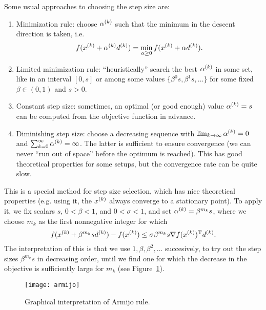 \documentclass{article}
\begin{document}
Some usual approaches to choosing the step size are:
\begin{enumerate}
\item Minimization rule: choose \(\alpha^{(k)}\) such that the minimum in the descent direction is
  taken, i.e.
  \begin{equation*}
    f(x^{(k)} + \alpha^{(k)}d^{(k)}) = \min_{\alpha \geq 0} f(x^{(k)} + \alpha d^{(k)}).
  \end{equation*}
\item Limited minimization rule: ``heuristically'' search the best \(\alpha^{(k)}\) in some set,
  like in an interval \([0, s]\) or among some values \(\{\beta^0 s, \beta^1 s, \ldots \}\) for some
  fixed \(\beta \in (0, 1)\) and \(s > 0\).
\item Constant step size: sometimes, an optimal (or good enough) value \(\alpha^{(k)} = s\) can be
  computed from the objective function in advance.
\item Diminishing step size: choose a decreasing sequence with
  \(\lim_{k \to \infty} \alpha^{(k)} = 0\) and \(\sum_{k = 0}^{\infty} \alpha^{(k)} = \infty\).  The
  latter is sufficient to ensure convergence (we can never ``run out of space'' before the optimum
  is reached).  This has good theoretical properties for some setups, but the convergence rate can
  be quite slow.
\end{enumerate}


\label{s:armijo-rule}

This is a special method for step size selection, which has nice theoretical properties (e.g. using
it, the \(x^{(k)}\) always converge to a stationary point).  To apply it, we fix scalars \(s\), \(0 <
\beta < 1\), and \(0 < \sigma < 1\), and set \(\alpha^{(k)} = \beta^{m_k} s\), where we choose
\(m_k\) as the first nonnegative integer for which
\begin{equation*}
  f(x^{(k)} + \beta^{m_k} s d^{(k)}) - f(x^{(k)}) \leq \sigma \beta^{m_k} s \nabla f(x^{(k)})^{\mathrm{T}} d^{(k)}.
\end{equation*}
The interpretation of this is that we use \(1, \beta, \beta^2, \ldots\) succesively, to try out the
step sizes \(\beta^{m_k} s\) in decreasing order, until we find one for which the decrease in the
objective is sufficiently large for \(m_k\) (see Figure~\ref{fig:armijo}).

\begin{figure}[H]
  \centering
  \texttt{[image: armijo]}
  \caption{Graphical interpretation of Armijo rule.\label{fig:armijo}}
\end{figure}
\end{document}
